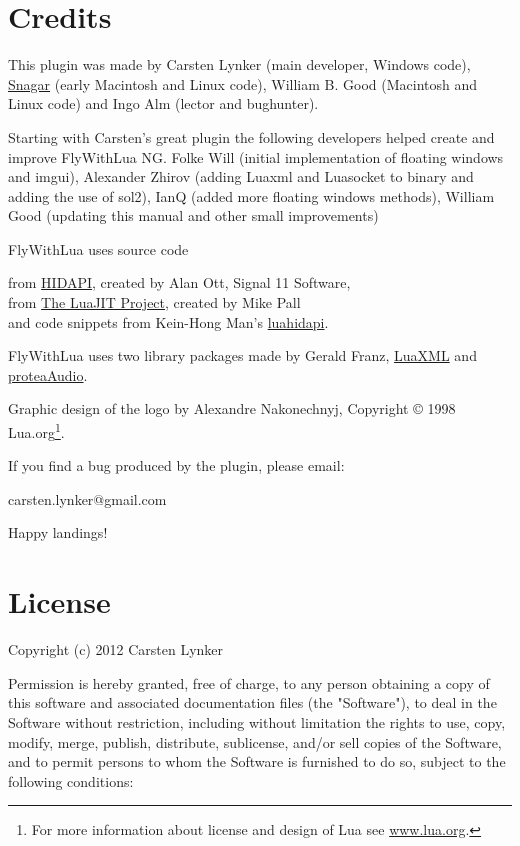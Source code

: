 \documentclass[11pt,parskip=half,a4paper]{scrartcl}
\begin{document}
\newpage
\section{Credits}

This plugin was made by Carsten Lynker (main developer, Windows code), \href{http://www.snagar.org/}{Snagar} (early Macintosh and Linux code), William B. Good (Macintosh and Linux code) and Ingo Alm (lector and bughunter).

Starting with Carsten's great plugin the following developers helped create and improve FlyWithLua NG. Folke Will (initial implementation of floating windows and imgui), Alexander Zhirov (adding Luaxml and Luasocket to binary and adding the use of sol2), IanQ (added more floating windows methods), William Good (updating this manual and other small improvements) 

FlyWithLua uses source code

from \href{http://www.signal11.us/oss/hidapi/}{HIDAPI}, created by Alan Ott, Signal 11 Software,\\
from \href{http://luajit.org/}{The LuaJIT Project}, created by Mike Pall\\
and code snippets from Kein-Hong Man's \href{https://sites.google.com/site/rubblepiles/hardware-stuff}{luahidapi}.

FlyWithLua uses two library packages made by Gerald Franz, \href{http://viremo.eludi.net/LuaXML/index.html}{LuaXML} and \href{http://viremo.eludi.net/proteaAudio/proteaaudiolua.html}{proteaAudio}.

Graphic design of the logo by Alexandre Nakonechnyj, Copyright © 1998 Lua.org\footnote{For more information about license and design of Lua see \url{www.lua.org}.}.

If you find a bug produced by the plugin, please email:

carsten.lynker@gmail.com

Happy landings!

\newpage
\section{License}

Copyright (c) 2012 Carsten Lynker

Permission is hereby granted, free of charge, to any person obtaining a copy of this software and associated documentation files (the "Software"), to deal in the Software without restriction, including without limitation the rights to use, copy, modify, merge, publish, distribute, sublicense, and/or sell copies of the Software, and to permit persons to whom the Software is furnished to do so, subject to the following conditions:
\end{document}
